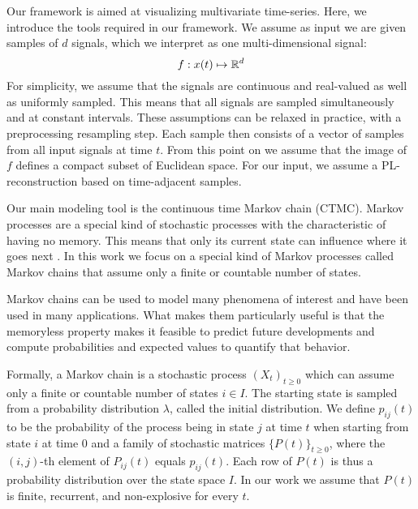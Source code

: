 \label{sec:preliminaries}
Our framework is aimed at visualizing multivariate time-series. Here, we introduce the tools required in our framework. We assume as input we are given samples of $d$ signals, which we interpret as one multi-dimensional signal:
$$f: x(t)\mapsto \mathbb{R}^d$$
For simplicity, we assume that the signals are continuous and real-valued as well as uniformly sampled. This means that all signals are sampled simultaneously and at constant intervals. These assumptions can be relaxed in practice, with a preprocessing resampling step.  Each sample then consists of a vector of samples from all input signals at time $t$. 
From this point on we  assume that the image of $f$ defines a compact subset of Euclidean space. For our input, we assume a PL-reconstruction based on time-adjacent samples. 




Our main modeling tool is the continuous time Markov chain (CTMC). Markov processes are a special kind of stochastic processes with the characteristic of having no memory. This means that only its current state can influence where it goes next \cite{norris1998markov}. In this work we focus on a special kind of Markov processes called Markov chains that assume only a finite or countable number of states.

Markov chains can be used to model many phenomena of interest and have been used in many
applications. What makes them particularly useful is that the memoryless
property makes it feasible to predict future developments and compute probabilities and
expected values to quantify that behavior.

Formally, a Markov chain is a stochastic process $(X_t)_{t \ge 0}$ which can assume 
only a finite or countable number of states $i \in I$. The starting state
is sampled from a probability distribution $\lambda$, called the initial distribution.
We define $p_{ij}(t)$ to be the probability of the process being in state $j$ at time $t$
when starting from state $i$ at time $0$ and a family of stochastic matrices $\{P(t)\}_{t \ge 0}$,
where the $(i,j)$-th element of $P_{ij}(t)$ equals $p_{ij}(t)$.
Each row of $P(t)$ is thus a probability distribution over the state space $I$. In our
work we assume that $P(t)$ is finite, recurrent, and non-explosive for every $t$. %

